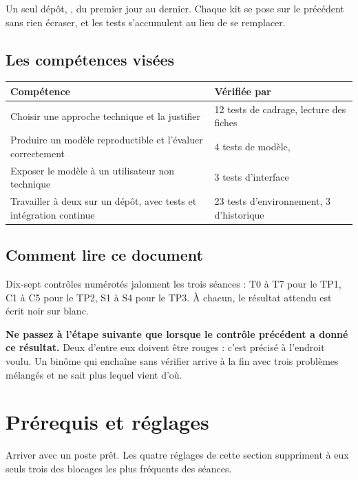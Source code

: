 \documentclass[11pt,a4paper]{article}
\newcommand{\co}[1]{\texttt{\detokenize{#1}}}
\begin{document}
Un seul dépôt, \co{sentiment-app}, du premier jour au dernier. Chaque kit se pose sur le précédent
sans rien écraser, et les tests s'accumulent au lieu de se remplacer.

\subsection{Les compétences visées}

\begin{center}
\begin{tabular}{@{}p{9.0cm}p{6.4cm}@{}}
\toprule
\textbf{Compétence} & \textbf{Vérifiée par} \\
\midrule
Choisir une approche technique et la justifier & 12 tests de cadrage, lecture des fiches \\
Produire un modèle reproductible et l'évaluer correctement & 4 tests de modèle, \co{metrics.json} \\
Exposer le modèle à un utilisateur non technique & 3 tests d'interface \\
Travailler à deux sur un dépôt, avec tests et intégration continue & 23 tests d'environnement, 3 d'historique \\
\bottomrule
\end{tabular}
\end{center}

\subsection{Comment lire ce document}

Dix-sept contrôles numérotés jalonnent les trois séances : T0 à T7 pour le TP1, C1 à C5 pour le TP2,
S1 à S4 pour le TP3. À chacun, le résultat attendu est écrit noir sur blanc.

\textbf{Ne passez à l'étape suivante que lorsque le contrôle précédent a donné ce résultat.} Deux
d'entre eux doivent être rouges : c'est précisé à l'endroit voulu. Un binôme qui enchaîne sans
vérifier arrive à la fin avec trois problèmes mélangés et ne sait plus lequel vient d'où.

\section{Prérequis et réglages}

\begin{objectif}
Arriver avec un poste prêt. Les quatre réglages de cette section suppriment à eux seuls trois des
blocages les plus fréquents des séances.
\end{objectif}
\end{document}
